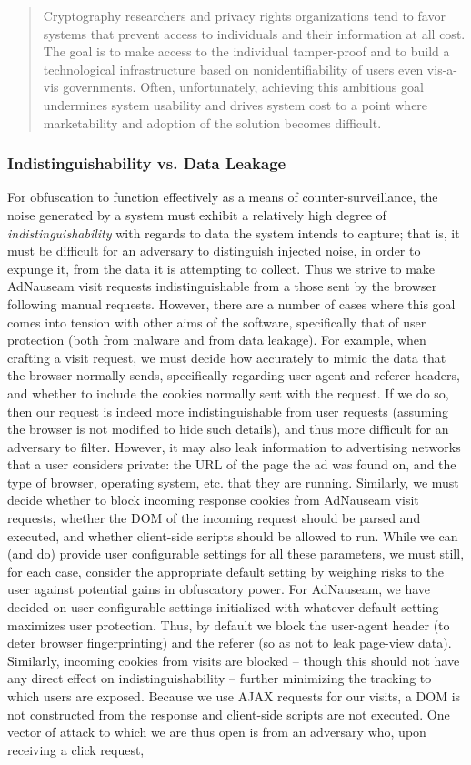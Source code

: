 \documentclass[conference]{IEEEtran}
\begin{document}
\blockquote{Cryptography researchers and privacy rights organizations tend to favor systems that prevent access to individuals and their information at all cost. The goal is to make access to the individual tamper-proof and to build a technological infrastructure based on nonidentifiability of users even vis-a-vis governments. Often, unfortunately, achieving this ambitious goal undermines system usability and drives system cost to a point where marketability and adoption of the solution becomes difficult.\cite{Spiekermann}}

\subsubsection{Indistinguishability vs. Data Leakage}

For obfuscation to function effectively as a means of counter-surveillance, the noise generated by a system must exhibit a relatively high degree of \emph{indistinguishability} with regards to data the system intends to capture; that is, it must be difficult for an adversary to distinguish injected noise, in order to expunge it, from the data it is attempting to collect. \cite{Gervais,Balsa} Thus we strive to make AdNauseam visit requests indistinguishable from a those sent by the browser following manual requests. However, there are a number of cases where this goal comes into tension with other aims of the software, specifically that of user protection (both from malware and from data leakage). For example, when crafting a visit request, we must decide how accurately to mimic the data that the browser normally sends, specifically regarding user-agent and referer headers, and whether to include the cookies normally sent with the request. If we do so, then our request is indeed more indistinguishable from user requests (assuming the browser is not modified to hide such details), and thus more difficult for an adversary to filter. However, it may also leak information to advertising networks that a user considers private: the URL of the page the ad was found on, and the type of browser, operating system, etc. that they are running. Similarly, we must decide whether to block incoming response cookies from AdNauseam visit requests, whether the DOM of the incoming request should be parsed and executed, and whether client-side scripts should be allowed to run. While we can (and do) provide user configurable settings for all these parameters, we must still, for each case, consider the appropriate default setting by weighing risks to the user against potential gains in obfuscatory power. For AdNauseam, we have decided on user-configurable settings initialized with whatever default setting maximizes user protection. Thus, by default we block the user-agent header (to deter browser fingerprinting) and the referer (so as not to leak page-view data). Similarly, incoming cookies from visits are blocked -- though this should not have any direct effect on indistinguishability -- further minimizing the tracking to which users are exposed. Because we use AJAX requests for our visits, a DOM is not constructed from the response and client-side scripts are not executed. One vector of attack to which we are thus open is from an adversary who, upon receiving a click request, 
\end{document}
